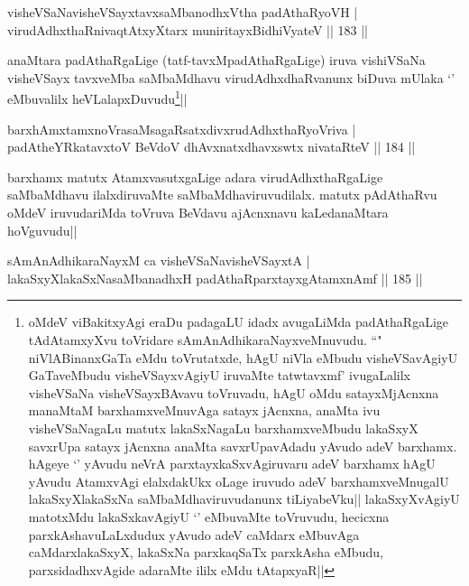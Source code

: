 
\begin{shl}
visheVSaNavisheVSayxtavxsaMbanodhxV\s tha padAthaRyoVH |\\
virudAdhxthaRnivaqtAtxyX\s tarx muniritayxBidhiVyateV \hfill || 183 ||
\end{shl}

\begin{artha}
anaMtara padAthaRgaLige (tatf-tavxMpadAthaRgaLige) iruva vishiVSaNa visheVSayx tavxveMba saMbaMdhavu virudAdhxdhaRvanunx biDuva mUlaka `\stext ' eMbuvalilx heVLalapxDuvudu\footnote[1]{oMdeV viBakitxyAgi eraDu padagaLU idadx avugaLiMda padAthaRgaLige tAdAtamxyXvu toVridare sAmAnAdhikaraNayxveMnuvudu. ``\stext " niVlABinanxGaTa eMdu toVrutatxde, hAgU niVla eMbudu visheVSavAgiyU GaTaveMbudu visheVSayxvAgiyU iruvaMte tatwtavxmf' ivugaLalilx visheVSaNa visheVSayxBAvavu toVruvadu, hAgU oMdu satayxMjAcnxna manaMtaM barxhamxveMnuvAga satayx jAcnxna, anaMta ivu visheVSaNagaLu matutx lakaSxNagaLu barxhamxveMbudu lakaSxyX savxrUpa satayx jAcnxna anaMta savxrUpavAdadu yAvudo adeV barxhamx. hAgeye `\stext ' yAvudu neVrA parxtayxkaSxvAgiruvaru adeV barxhamx hAgU yAvudu AtamxvAgi elalxdakUkx oLage iruvudo adeV barxhamxveMnugalU lakaSxyXlakaSxNa saMbaMdhaviruvudanunx tiLiyabeVku|| lakaSxyXvAgiyU matotxMdu lakaSxkavAgiyU `\stext ' eMbuvaMte toVruvudu, hecicxna parxkAshavuLaLxdudux yAvudo adeV caMdarx eMbuvAga caMdarxlakaSxyX, lakaSxNa parxkaqSaTx parxkAsha eMbudu, parxsidadhxvAgide adaraMte ililx eMdu tAtapxyaR||}||
\end{artha}

\begin{shl}
barxhAmxtamxnoVrasaMsagaRsatxdivxrudAdhxthaRyoVriva |\\
padAtheYRkatavxtoV BeVdoV dhAvxnatxdhavxswtx nivataRteV \hfill || 184 ||
\end{shl}

\begin{artha}
barxhamx matutx AtamxvasutxgaLige adara virudAdhxthaRgaLige saMbaMdhavu ilalxdiruvaMte saMbaMdhaviruvudilalx. matutx pAdAthaRvu oMdeV iruvudariMda toVruva BeVdavu ajAcnxnavu kaLedanaMtara hoVguvudu||
\end{artha}


\begin{shl}
sAmAnAdhikaraNayxM ca visheVSaNavisheVSayxtA |\\
lakaSxyXlakaSxNasaMbanadhxH padAthaRparxtayxgAtamxnAmf \hfill || 185 ||
\end{shl}

